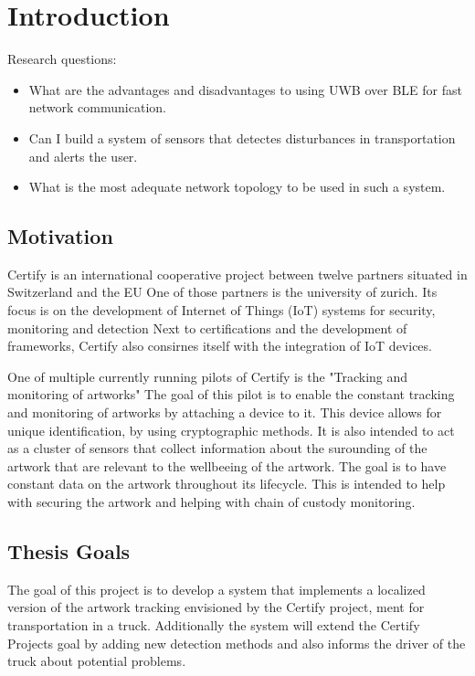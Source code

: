 \chapter{Introduction}

Research questions:
\begin{itemize}
	\item What are the advantages and disadvantages to using UWB over BLE for fast network communication.
	\item Can I build a system of sensors that detectes disturbances in transportation and alerts the user.
	\item What is the most adequate network topology to be used in such a system.
\end{itemize}

\section{Motivation}

Certify is an international cooperative project between twelve partners situated in Switzerland and the EU %
One of those partners is the university of zurich.
Its focus is on the development of Internet of Things (IoT) systems for security, monitoring and detection %
Next to certifications and the development of frameworks, Certify also consirnes itself with the integration of IoT devices.


One of multiple currently running pilots of Certify is the "Tracking and monitoring of artworks" %
The goal of this pilot is to enable the constant tracking and monitoring of artworks by attaching a device to it.
This device allows for unique identification, by using cryptographic methods.
It is also intended to act as a cluster of sensors that collect information about the surounding of the artwork that are relevant to the wellbeeing of the artwork.
The goal is to have constant data on the artwork throughout its lifecycle.
This is intended to help with securing the artwork and helping with chain of custody monitoring.



\section{Thesis Goals}

The goal of this project is to develop a system that implements a localized version of the artwork tracking envisioned by the Certify project, ment for transportation in a truck.
Additionally the system will extend the Certify Projects goal by adding new detection methods and also informs the driver of the truck about potential problems.

